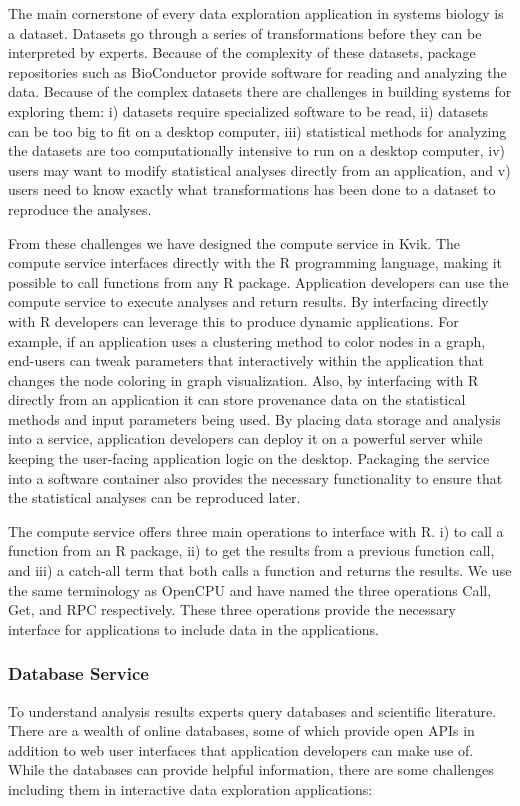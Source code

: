 The main cornerstone of every data exploration application in systems biology is
a dataset. Datasets go through a series of transformations before they can be
interpreted by experts. Because of the complexity of these datasets, package
repositories such as BioConductor provide software for reading and analyzing the
data. Because of the complex datasets there are challenges in building systems
for exploring them: 
i) datasets require specialized software to be read,
ii) datasets can be too big to fit on a desktop computer,
iii) statistical methods for analyzing the datasets are too computationally
intensive to run on a desktop computer, 
iv) users may want to modify statistical analyses directly from an application, 
and 
v) users need to know exactly what transformations has been done to a dataset to
reproduce the analyses. 

From these challenges we have designed the compute service in Kvik. The compute
service interfaces directly with the R programming language, making it possible
to call functions from any R package. Application developers can use the
compute service to execute analyses and return results. By interfacing directly
with R developers can leverage this to produce dynamic applications. For example,
if an application uses a clustering method to color nodes in a graph, end-users
can tweak parameters that interactively within the application that changes the
node coloring in graph visualization. Also, by interfacing with R directly from
an application it can store provenance data on the statistical methods and input
parameters being used. 
By placing data storage and analysis into a service, application developers can
deploy it on a powerful server while keeping the user-facing application logic
on the desktop. Packaging the service into a software container also
provides the necessary functionality to ensure that the statistical analyses can
be reproduced later. 

The compute service offers three main operations to interface with R. 
i) to call a function from an R package,
ii) to get the results from a previous function call,
and iii) a catch-all term that both calls a function and returns the results. 
We use the same terminology as OpenCPU and have named the three operations Call,
Get, and RPC respectively. These three operations provide the necessary
interface for applications to include data in the applications. %

\subsubsection*{Database Service} 
To understand analysis results experts query databases and scientific
literature. There are a wealth of online databases, some of which provide open
APIs in addition to web user interfaces that application developers can make use
of. While the databases can provide helpful information, there are some
challenges including them in interactive data exploration applications: 

